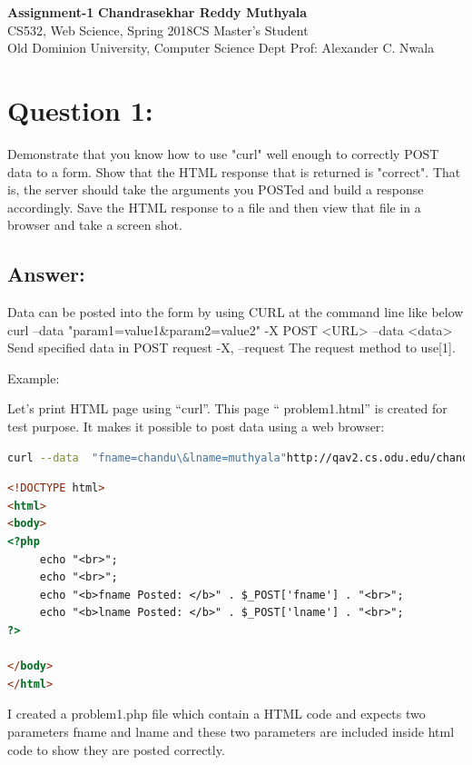 \documentclass[a4paper, 11pt]{article}
\begin{document}
\noindent
\large\textbf{Assignment-1} \hfill \textbf{Chandrasekhar Reddy Muthyala} \\
\normalsize CS532, Web Science, Spring 2018\hfill CS Master's Student \\
Old Dominion University, Computer Science Dept \hfill Prof:  Alexander C. Nwala

\section*{Question 1:}
 Demonstrate that you know how to use "curl" well enough to correctly POST data to a form.  Show that the HTML response that is returned is "correct".  That is, the server should take the arguments you POSTed and build a response accordingly.  Save the HTML response to a file and then view that file in a browser and take a screen shot.



\subsection*{Answer:}
Data can be posted into the form by using CURL at the command line like below
curl --data  "param1=value1\&param2=value2" -X POST <URL>
--data <data> Send specified data in POST request 
-X, --request The request method to use[1].

Example: 

Let's print HTML  page using ``curl''. This page `` problem1.html'' is created for test purpose. It makes it possible to post data using a web browser:

\begin{lstlisting}[language=bash,label=Command:,caption=Command:]
curl --data  "fname=chandu\&lname=muthyala"http://qav2.cs.odu.edu/chandu/WebSciences/A1/problem1.php -o problem1.html
\end{lstlisting}
\begin{lstlisting}[language=html,label=Output:,caption=Output: The content of problem1.html]
<!DOCTYPE html>
<html>
<body>
<?php
     echo "<br>";
     echo "<br>";
     echo "<b>fname Posted: </b>" . $_POST['fname'] . "<br>";
     echo "<b>lname Posted: </b>" . $_POST['lname'] . "<br>";
?>

</body>
</html>
\end{lstlisting}
 I created a problem1.php file which contain a HTML code and expects  two parameters  fname  and lname  and these two parameters  are included inside html code to show they are posted correctly. 
\end{document}
